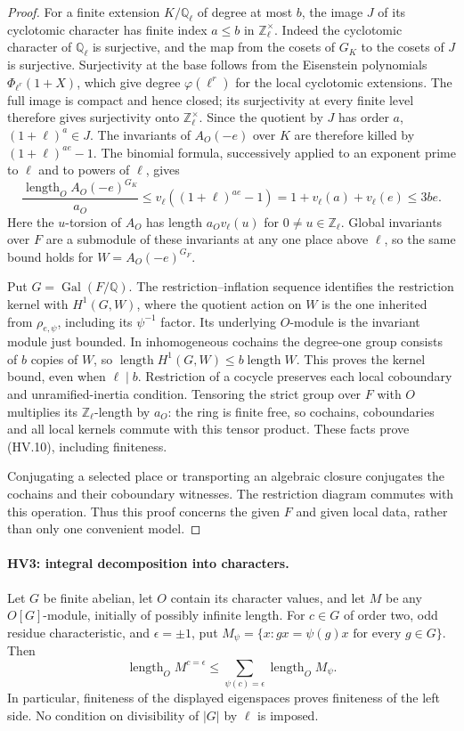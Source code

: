 \begin{proof}
For a finite extension $K/\mathbb Q_\ell$ of degree at most $b$,
the image $J$ of its cyclotomic character has finite index
$a\le b$ in $\mathbb Z_\ell^\times$.  Indeed the cyclotomic
character of $\mathbb Q_\ell$ is surjective, and the map from
the cosets of $G_K$ to the cosets of $J$ is surjective.
Surjectivity at the base follows from the Eisenstein
polynomials $\Phi_{\ell^r}(1+X)$, which give degree
$\varphi(\ell^r)$ for the local cyclotomic extensions.
The full image is compact and hence closed; its surjectivity
at every finite level therefore gives surjectivity onto
$\mathbb Z_\ell^\times$.
Since the quotient by $J$ has order $a$, $(1+\ell)^a\in J$.
The invariants of $A_O(-e)$ over $K$ are therefore killed by
$(1+\ell)^{ae}-1$.  The binomial formula, successively applied
to an exponent prime to $\ell$ and to powers of $\ell$, gives
\[
 \frac{\operatorname{length}_O A_O(-e)^{G_K}}{a_O}
 \le v_\ell((1+\ell)^{ae}-1)
 =1+v_\ell(a)+v_\ell(e)\le3be.
 \tag{HV.11}
\]
Here the $u$-torsion of $A_O$ has length $a_Ov_\ell(u)$
for $0\ne u\in\mathbb Z_\ell$.  Global invariants over $F$
are a submodule of these invariants at any one place above
$\ell$, so the same bound holds for
$W=A_O(-e)^{G_F}$.

Put $G=\operatorname{Gal}(F/\mathbb Q)$.
The restriction--inflation sequence identifies the restriction
kernel with $H^1(G,W)$, where the quotient action on $W$ is
the one inherited from $\rho_{e,\psi}$, including its
$\psi^{-1}$ factor.  Its underlying $O$-module is the invariant
module just bounded.  In inhomogeneous cochains the degree-one
group consists of $b$ copies of $W$, so
$\operatorname{length}H^1(G,W)\le b\operatorname{length}W$.
This proves the kernel bound, even when $\ell\mid b$.
Restriction of a cocycle preserves each local coboundary and
unramified-inertia condition.  Tensoring the strict group over
$F$ with $O$ multiplies its $\mathbb Z_\ell$-length by $a_O$:
the ring is finite free, so cochains, coboundaries and all local
kernels commute with this tensor product.  These facts prove
(HV.10), including finiteness.

Conjugating a selected place or transporting an algebraic closure
conjugates the cochains and their coboundary witnesses.  The
restriction diagram commutes with this operation.  Thus this
proof concerns the given $F$ and given local data, rather than
only one convenient model.
\end{proof}

\paragraph{HV3: integral decomposition into characters.}
\label{claim:HV3}
Let $G$ be finite abelian, let $O$ contain its character values,
and let $M$ be any $O[G]$-module, initially of possibly infinite
length.  For $c\in G$ of order two, odd residue characteristic,
and $\epsilon=\pm1$, put
$M_\psi=\{x:gx=\psi(g)x\text{ for every }g\in G\}$.
Then
\[
 \operatorname{length}_O M^{c=\epsilon}
 \le\sum_{\psi(c)=\epsilon}\operatorname{length}_O M_\psi.
 \tag{HV.12}
\]
In particular, finiteness of the displayed eigenspaces proves
finiteness of the left side.  No condition on divisibility of
$|G|$ by $\ell$ is imposed.

